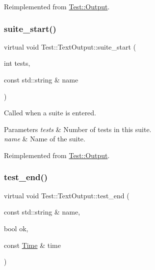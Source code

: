 Reimplemented from \mbox{\hyperlink{class_test_1_1_output_a6dbf4c0adb2bd4a7364c629179f788a6}{Test\+::\+Output}}.

\mbox{\label{class_test_1_1_text_output_a0b6479918ee7f0501dfcdfcbc7c9d190}} 
\subsubsection{\texorpdfstring{suite\+\_\+start()}{suite\_start()}}
{\footnotesize\ttfamily virtual void Test\+::\+Text\+Output\+::suite\+\_\+start (\begin{DoxyParamCaption}\item[{int}]{tests,  }\item[{const std\+::string \&}]{name }\end{DoxyParamCaption})\hspace{0.3cm}{\ttfamily [virtual]}}

Called when a suite is entered.


\begin{DoxyParams}{Parameters}
{\em tests} & Number of tests in this suite. \\
\hline
{\em name} & Name of the suite. \\
\hline
\end{DoxyParams}


Reimplemented from \mbox{\hyperlink{class_test_1_1_output_a7022c32c5a1577b10b93d3942746f17d}{Test\+::\+Output}}.

\mbox{\label{class_test_1_1_text_output_a0ff333537e85d680740c72dd46cd2e7e}} 
\subsubsection{\texorpdfstring{test\+\_\+end()}{test\_end()}}
{\footnotesize\ttfamily virtual void Test\+::\+Text\+Output\+::test\+\_\+end (\begin{DoxyParamCaption}\item[{const std\+::string \&}]{name,  }\item[{bool}]{ok,  }\item[{const \mbox{\hyperlink{class_test_1_1_time}{Time}} \&}]{time }\end{DoxyParamCaption})\hspace{0.3cm}{\ttfamily [virtual]}}

